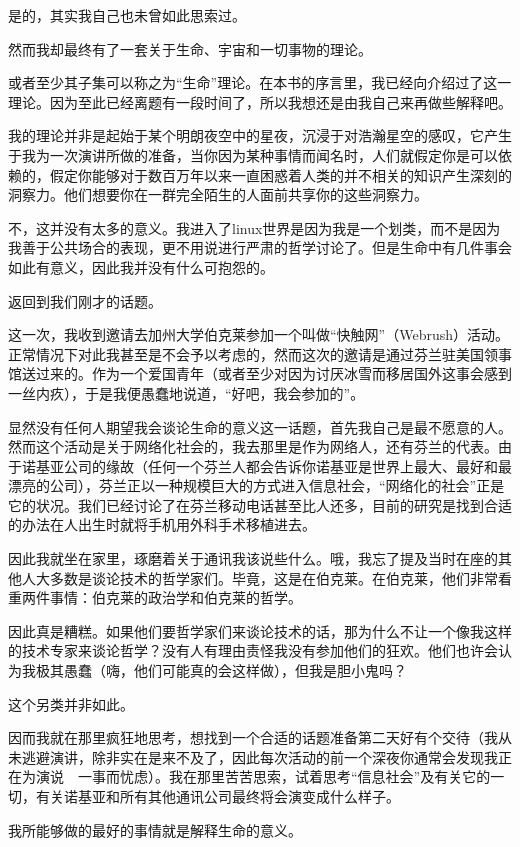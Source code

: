 是的，其实我自己也未曾如此思索过。

然而我却最终有了一套关于生命、宇宙和一切事物的理论。

或者至少其子集可以称之为“生命”理论。在本书的序言里，我已经向介绍过了这一理论。因为至此已经离题有一段时间了，所以我想还是由我自己来再做些解释吧。

我的理论并非是起始于某个明朗夜空中的星夜，沉浸于对浩瀚星空的感叹，它产生于我为一次演讲所做的准备，当你因为某种事情而闻名时，人们就假定你是可以依赖的，假定你能够对于数百万年以来一直困惑着人类的并不相关的知识产生深刻的洞察力。他们想要你在一群完全陌生的人面前共享你的这些洞察力。

不，这并没有太多的意义。我进入了linux世界是因为我是一个划类，而不是因为我善于公共场合的表现，更不用说进行严肃的哲学讨论了。但是生命中有几件事会如此有意义，因此我并没有什么可抱怨的。

返回到我们刚才的话题。

这一次，我收到邀请去加州大学伯克莱参加一个叫做“快触网”（Webrush）活动。正常情况下对此我甚至是不会予以考虑的，然而这次的邀请是通过芬兰驻美国领事馆送过来的。作为一个爱国青年（或者至少对因为讨厌冰雪而移居国外这事会感到一丝内疚），于是我便愚蠢地说道，“好吧，我会参加的”。

显然没有任何人期望我会谈论生命的意义这一话题，首先我自己是最不愿意的人。然而这个活动是关于网络化社会的，我去那里是作为网络人，还有芬兰的代表。由于诺基亚公司的缘故（任何一个芬兰人都会告诉你诺基亚是世界上最大、最好和最漂亮的公司），芬兰正以一种规模巨大的方式进入信息社会，“网络化的社会”正是它的状况。我们已经讨论了在芬兰移动电话甚至比人还多，目前的研究是找到合适的办法在人出生时就将手机用外科手术移植进去。

因此我就坐在家里，琢磨着关于通讯我该说些什么。哦，我忘了提及当时在座的其他人大多数是谈论技术的哲学家们。毕竟，这是在伯克莱。在伯克莱，他们非常看重两件事情：伯克莱的政治学和伯克莱的哲学。

因此真是糟糕。如果他们要哲学家们来谈论技术的话，那为什么不让一个像我这样的技术专家来谈论哲学？没有人有理由责怪我没有参加他们的狂欢。他们也许会认为我极其愚蠢（嗨，他们可能真的会这样做），但我是胆小鬼吗？

这个另类并非如此。

因而我就在那里疯狂地思考，想找到一个合适的话题准备第二天好有个交待（我从未逃避演讲，除非实在是来不及了，因此每次活动的前一个深夜你通常会发现我正在为演说　一事而忧虑）。我在那里苦苦思索，试着思考“信息社会”及有关它的一切，有关诺基亚和所有其他通讯公司最终将会演变成什么样子。

我所能够做的最好的事情就是解释生命的意义。

